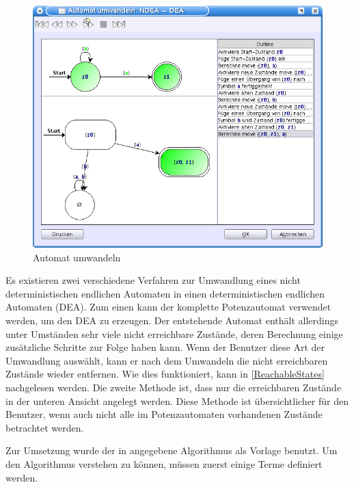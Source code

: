 \begin{figure}[h!]
\begin{center}
\includegraphics[width=12cm]{../images/convert_to.png}
\caption{Automat umwandeln}
\label{FigureConvertTo}
\end{center}
\end{figure}
\vspace{10pt}

Es existieren zwei verschiedene Verfahren zur Umwandlung eines nicht
deterministischen endlichen Automaten in einen deterministischen endlichen
Automaten (DEA). Zum einen kann der komplette Potenzautomat verwendet werden, um
den DEA zu erzeugen. Der entstehende Automat enthält allerdings unter Umständen
sehr viele nicht erreichbare Zustände, deren Berechnung einige zusätzliche
Schritte zur Folge haben kann. Wenn der Benutzer diese Art der Umwandlung
auswählt, kann er nach dem Umwandeln die nicht erreichbaren Zustände wieder
entfernen. Wie dies funktioniert, kann in \ref{ReachableStates} nachgelesen
werden. Die zweite Methode ist, dass nur die erreichbaren Zustände in der unteren
Ansicht angelegt werden. Diese Methode ist übersichtlicher für den Benutzer, wenn
auch nicht alle im Potenzautomaten vorhandenen Zustände betrachtet
werden.\vspace{10pt}

\newpage
Zur Umsetzung wurde der in \cite[S. 153ff]{Compilers} angegebene Algorithmus als
Vorlage benutzt. Um den Algorithmus verstehen zu können, müssen zuerst einige
Terme definiert werden.\vspace{10pt}

